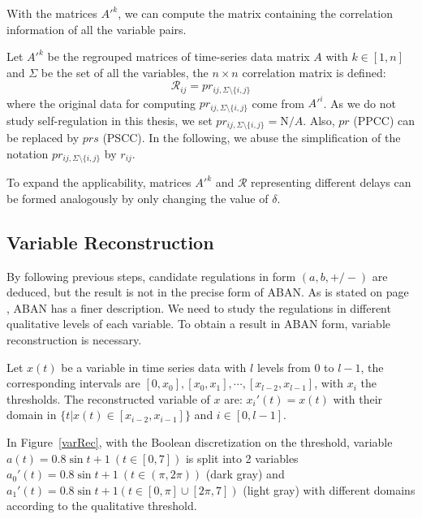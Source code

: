 With the matrices $A'^k$, we can compute the matrix containing the correlation information of all the variable pairs.

\begin{definition}\label{def:corrMatrix}
    Let $A'^k$ be the regrouped matrices of time-series data matrix $A$ with $k\in [1,n]$ and $\Sigma$ be the set of all the variables, the $n\times n$ correlation matrix is defined:
    $$\mathcal{R}_{ij}=pr_{ij,\Sigma\setminus\{i,j\}}$$ 
    where the original data for computing $pr_{ij,\Sigma\setminus\{i,j\}}$ come from $A'^i$.
    As we do not study self-regulation in this thesis, we set $pr_{ij,\Sigma\setminus\{i,j\}}=\mathrm N/A$.
    Also, $pr$ (PPCC) can be replaced by $prs$ (PSCC).
    In the following, we abuse the simplification of the notation $pr_{ij,\Sigma\setminus\{i,j\}}$ by $r_{ij}$.
\end{definition}

To expand the applicability, matrices $A'^k$ and $\mathcal{R}$ representing different delays can be formed analogously by only changing the value of $\delta$.

\subsection{Variable Reconstruction}
By following previous steps, candidate regulations in form $(a,b,+/-)$ are deduced, but the result is not in the precise form of ABAN. 
As is stated on page \pageref{par:advantage}, ABAN has a finer description.
We need to study the regulations in different qualitative levels of each variable.
To obtain a result in ABAN form, variable reconstruction is necessary.

\begin{definition}
    Let $x(t)$ be a variable in time series data with $l$ levels from $0$ to $l-1$, the corresponding intervals are $[0,x_0],[x_0,x_1],\cdots,[x_{l-2},x_{l-1}]$, with $x_i$ the thresholds. 
    The reconstructed variable of $x$ are:
        $x_i'(t)=x(t)$ with their domain in $\{t|x(t)\in [x_{i-2},x_{i-1}]\}$ and $i\in [0,l-1]$.
\end{definition}

\begin{example}
In Figure~\ref{varRec}, with the Boolean discretization on the threshold, variable $a(t)=0.8\sin t+1\ (t\in [0,7])$ is split into 2 variables $a_0'(t)=0.8\sin t+1\ (t\in (\pi,2\pi))$ (dark gray) and $a_1'(t)=0.8\sin t+1(t\in [0,\pi]\cup[2\pi,7])$ (light gray) with different domains according to the qualitative threshold.
\end{example}

